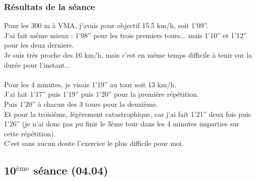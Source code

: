 \documentclass{article}
\begin{document}
        \subsubsection*{Résultats de la séance}
            Pour les 300 m à VMA, j'avais pour objectif 15.5 km/h, soit 1'09''.\\
            J'ai fait même mieux : 1'08'' pour les trois premiers tours... mais 1'10'' et 1'12'' pour les deux derniers.\\
            Je suis très proche des 16 km/h, mais c'est en même temps difficile à tenir sur la durée pour l'instant...\\\\
            Pour les 4 minutes, je visais 1'19'' au tour soit 13 km/h.\\
            J'ai fait 1'17'' puis 1'19'' puis 1'20'' pour la première répétition.\\
            Puis 1'20'' à chacun des 3 tours pour la deuxième.\\
            Et pour la troisième, légèrement catastrophique, car j'ai fait 1'21'' deux fois puis 1'26'' (je n'ai donc pas pu finir le 3ème tour dans les 4 minutes imparties sur cette répétition).\\
            C'est sans aucun doute l'exercice le plus difficile pour moi.
        
        
    \subsection{10$^{\text{ème}}$ séance (04.04)}
\end{document}
